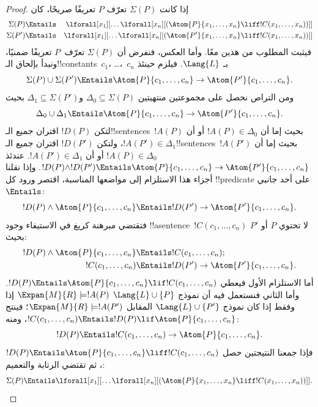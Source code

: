 \documentclass[../../../include/open-logic-section]{subfiles}
\begin{document}
\begin{proof}
إذا كانت $\Sigma(P)$ تعرّف $P$ تعريفًا صريحًا، كان
\begin{align*}
  \Sigma(P) & \Entails & \lforall[x_1][\dots \lforall[x_n]
    [(\Atom{P}{x_1,\dots, x_n} \liff !C(x_1,\dots,x_n))]]\\
  \Sigma(P') & \Entails & \lforall[x_1][\dots \lforall[x_n]
    [(\Atom{P'}{x_1,\dots, x_n} \liff !C(x_1,\dots,x_n))]]
\end{align*}
فيثبت المطلوب من هذين معًا. وأما العكس، فنفرض أن $\Sigma(P)$ تعرّف~$P$ تعريفًا
ضمنيًا، ونبدأ بإلحاق الـ!!{constant}s~$c_1$، \dots،~$c_n$ بـ
$\Lang{L}$. فيلزم حينئذ
\[
\Sigma(P) \cup \Sigma(P') \Entails
\Atom{P}{c_1, \dots, c_n} \to \Atom{P'}{c_1, \dots, c_n}.
\]
ومن التراص نحصل على مجموعتين منتهيتين
$\Delta_0 \subseteq \Sigma(P)$ و$\Delta_1 \subseteq \Sigma(P')$ بحيث
\[
\Delta_0 \cup \Delta_1 \Entails
\Atom{P}{c_1, \dots, c_n} \to \Atom{P'}{c_1, \dots, c_n}.
\]
لتكن $!D(P)$ اقتران جميع الـ!!{sentence}s~$!A(P)$ بحيث إما أن
$!A(P) \in \Delta_0$ أو أن $!A(P') \in \Delta_1$، ولتكن $!D(P')$
اقتران جميع الـ!!{sentence}s~$!A(P')$ بحيث إما أن
$!A(P) \in \Delta_0$ أو أن $!A(P') \in \Delta_1$. عندئذ
$!D(P) \land !D(P') \Entails \Atom{P}{c_1,\dots,c_n} \to
\Atom{P'}{c_1,\dots,c_n}$. وإذا نقلنا أجزاء هذا الاستلزام إلى مواضعها المناسبة، اقتصر ورود كل
!!{predicate} على أحد جانبي $\Entails$:
\[
!D(P) \land \Atom{P}{c_1, \dots, c_n} \Entails
!D(P') \to \Atom{P'}{c_1, \dots, c_n}.
\]
فتقتضي مبرهنة كريغ في الاستيفاء وجود !!a{sentence}~$!C(c_1,\dots,c_n)$ لا
تحتوي $P$ أو $P'$ بحيث:
\begin{align*}
  !D(P) \land \Atom{P}{c_1, \dots, c_n} & \Entails !C(c_1,\dots, c_n); \\
  !C(c_1,\dots, c_n) & \Entails !D(P') \to \Atom{P'}{c_1, \dots, c_n}.
\end{align*}
أما الاستلزام الأول فيعطي
$!D(P) \Entails \Atom{P}{c_1,\dots,c_n} \lif !C(c_1,\dots,c_n)$.
وأما الثاني فنستعمل فيه أن نموذج $\Lang{L} \cup \{P\}$
$\Expan{M}{R} \models !A(P)$ إذا وفقط إذا كان نموذج
$\Lang{L} \cup \{P'\}$ المقابل $\Expan{M}{R} \models !A(P')$؛ فينتج $!C(c_1,\dots,c_n) \Entails !D(P) \lif
\Atom{P}{c_1,\dots,c_n}$، ومنه:
\[
!D(P) \Entails !C(c_1,\dots,c_n) \to \Atom{P}{c_1,\dots, c_n}.
\]
فإذا جمعنا النتيجتين حصل
$!D(P) \Entails \Atom{P}{c_1,\dots,c_n} \liff
!C(c_1,\dots,c_n)$، ثم تقتضي الرتابة والتعميم:
\[
\Sigma(P) \Entails
\lforall[x_1][\dots\lforall[x_n][(\Atom{P}{x_1,\dots, x_n} \liff
    !C(x_1,\dots, x_n))]].
\]
\end{proof}
\end{document}
